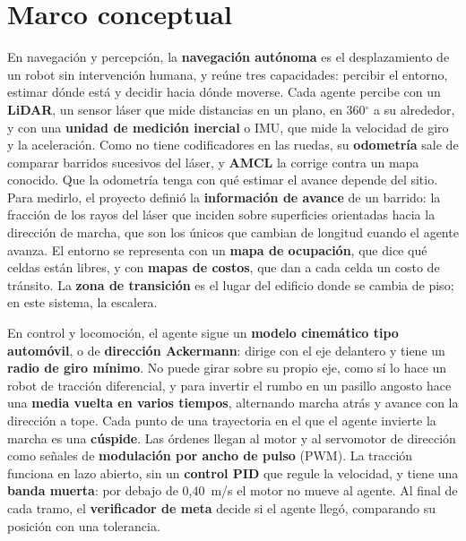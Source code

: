 \section{Marco conceptual}
\label{sec:conceptual}

En navegación y percepción, la \textbf{navegación autónoma} es el desplazamiento
de un robot sin intervención humana, y reúne tres capacidades: percibir el
entorno, estimar dónde está y decidir hacia dónde moverse. Cada agente percibe
con un \textbf{LiDAR}, un sensor láser que mide distancias en un plano, en
360$^\circ$ a su alrededor, y con una \textbf{unidad de medición inercial} o
IMU, que mide la velocidad de giro y la aceleración. Como no tiene codificadores
en las ruedas, su \textbf{odometría} sale de comparar barridos sucesivos del
láser, y \textbf{AMCL} la corrige contra un mapa conocido. Que la odometría
tenga con qué estimar el avance depende del sitio. Para medirlo, el proyecto definió la \textbf{información de avance} de un
barrido: la fracción de los rayos del láser que inciden sobre superficies
orientadas hacia la dirección de marcha, que son los únicos que cambian de longitud
cuando el agente avanza. El entorno
se representa con un \textbf{mapa de ocupación}, que dice qué celdas están libres,
y con \textbf{mapas de costos}, que dan a cada celda un costo de tránsito. La
\textbf{zona de transición} es el lugar del edificio donde se cambia de piso; en
este sistema, la escalera.

En control y locomoción, el agente sigue un \textbf{modelo cinemático tipo
automóvil}, o de \textbf{dirección Ackermann}: dirige con el eje delantero y
tiene un \textbf{radio de giro mínimo}. No puede girar sobre su propio eje, como sí lo
hace un robot de tracción diferencial, y para invertir el rumbo en un
pasillo angosto hace una \textbf{media vuelta en varios tiempos}, alternando
marcha atrás y avance con la dirección a tope. Cada punto de una trayectoria en
el que el agente invierte la marcha es una \textbf{cúspide}. Las órdenes llegan
al motor y al servomotor de dirección como señales de \textbf{modulación por
ancho de pulso} (PWM). La tracción funciona en lazo abierto, sin un
\textbf{control PID} que regule la velocidad, y tiene una \textbf{banda muerta}:
por debajo de 0,40~m/s el motor no mueve al agente. Al final de cada tramo, el
\textbf{verificador de meta} decide si el agente llegó, comparando su posición
con una tolerancia.

